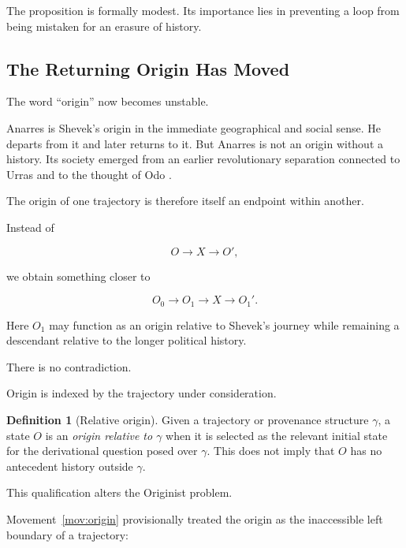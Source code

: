 \documentclass[
  11pt,
  a4paper,
  DIV=12,
  BCOR=0mm,
  parskip=half-
]{scrartcl}
\theoremstyle{definition}
\newtheorem{definition}{Definition}[section]
\theoremstyle{plain}
\theoremstyle{remark}
\begin{document}
The proposition is formally modest. Its importance lies in preventing a loop
from being mistaken for an erasure of history.


\subsection{The Returning Origin Has Moved}
\label{sec:returning-origin}

The word \enquote{origin} now becomes unstable.

Anarres is Shevek's origin in the immediate geographical and social sense. He
departs from it and later returns to it. But Anarres is not an origin without
a history. Its society emerged from an earlier revolutionary separation
connected to Urras and to the thought of Odo \cite{leguin1974}.

The origin of one trajectory is therefore itself an endpoint within another.

Instead of

\[
  O
  \longrightarrow
  X
  \longrightarrow
  O',
\]

we obtain something closer to

\[
  O_0
  \longrightarrow
  O_1
  \longrightarrow
  X
  \longrightarrow
  O_1'.
\]

Here \(O_1\) may function as an origin relative to Shevek's journey while
remaining a descendant relative to the longer political history.

There is no contradiction.

Origin is indexed by the trajectory under consideration.

\begin{definition}[Relative origin]
\label{def:relative-origin}
Given a trajectory or provenance structure \(\gamma\), a state \(O\) is an
\emph{origin relative to \(\gamma\)} when it is selected as the relevant
initial state for the derivational question posed over \(\gamma\). This does
not imply that \(O\) has no antecedent history outside \(\gamma\).
\end{definition}

This qualification alters the Originist problem.

Movement~\ref{mov:origin} provisionally treated the origin as the inaccessible
left boundary of a trajectory:
\end{document}
